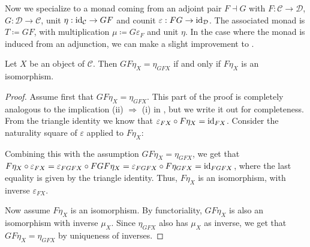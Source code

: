 Now we specialize to a monad coming from an adjoint pair
$F \dashv G$ with $F : \mathcal{C} \to \mathcal{D}$, $G : \mathcal{D} \to \mathcal{C}$, unit $\eta : \mathrm{id}_{\mathcal{C}} \to GF$ and counit $\varepsilon : FG \to \mathrm{id}_{\mathcal{D}}$.
The associated monad is $T \coloneq GF$, with multiplication $\mu \coloneq G \varepsilon_F$ and unit $\eta$.
In the case where the monad is induced from an adjunction, we can make a slight improvement to .

\begin{proposition}\label{prp:monad-adjunction-well-pointed-improvement}
  Let $X$ be an object of $\mathcal{C}$.
  Then $GF\eta_X = \eta_{GFX}$ if and only if $F\eta_X$ is an isomorphism.
\end{proposition}

\begin{proof}
  Assume first that $GF\eta_X = \eta_{GFX}$.
  This part of the proof is completely analogous to the implication (ii) $\Rightarrow$ (i) in , but we write it out for completeness.
  From the triangle identity we know that $\varepsilon_{FX} \circ F\eta_X = \mathrm{id}_{FX}$.
  Consider the naturality square of $\varepsilon$ applied to $F\eta_X$:
  \begin{center}
  \end{center}
  Combining this with the assumption $GF\eta_X = \eta_{GFX}$, we get that $F\eta_X \circ \varepsilon_{FX} = \varepsilon_{FGFX} \circ FGF\eta_X = \varepsilon_{FGFX} \circ F\eta_{GFX} = \mathrm{id}_{FGFX}$, where the last equality is given by the triangle identity.
  Thus, $F\eta_X$ is an isomorphism, with inverse $\varepsilon_{FX}$.

  Now assume $F\eta_X$ is an isomorphism.
  By functoriality, $GF\eta_X$ is also an isomorphism with inverse $\mu_X$.
  Since $\eta_{GFX}$ also has $\mu_X$ as inverse, we get that $GF\eta_X = \eta_{GFX}$ by uniqueness of inverses.
\end{proof}

